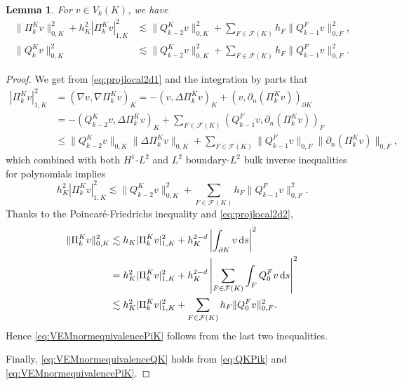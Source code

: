 \documentclass[10pt]{amsart}
\newtheorem{lemma}[theorem]{Lemma}
\numberwithin{equation}{section}
\begin{document}
\begin{lemma}
For $v\in V_k(K)$, we have
\begin{align}
\|\Pi_k^Kv\|_{0,K}^2+h_K^2|\Pi_k^Kv|_{1,K}^2&\lesssim \|Q_{k-2}^Kv\|_{0,K}^2+\sum_{F\in\mathcal F(K)}h_F\|Q_{k-1}^Fv\|_{0,F}^2, \label{eq:VEMnormequivalencePiK}\\
\|Q_k^Kv\|_{0,K}^2&\lesssim \|Q_{k-2}^Kv\|_{0,K}^2+\sum_{F\in\mathcal F(K)}h_F\|Q_{k-1}^Fv\|_{0,F}^2. \label{eq:VEMnormequivalenceQK}
\end{align}
\end{lemma}
\begin{proof}
We get from \eqref{eq:projlocal2d1} and the integration by parts that
\begin{align*}
|\Pi_k^Kv|_{1,K}^2&=(\nabla v, \nabla\Pi_k^Kv)_K=-(v, \Delta\Pi_k^Kv)_K+(v, \partial_n(\Pi_k^Kv))_{\partial K} \\
&=-(Q_{k-2}^Kv, \Delta\Pi_k^Kv)_K+\sum_{F\in\mathcal F(K)}(Q_{k-1}^Fv, \partial_n(\Pi_k^Kv))_{F} \\
&\leq\|Q_{k-2}^Kv\|_{0,K}\|\Delta\Pi_k^Kv\|_{0,K}+\sum_{F\in\mathcal F(K)}\|Q_{k-1}^Fv\|_{0,F}\|\partial_n(\Pi_k^Kv)\|_{0,F},
\end{align*}
which combined with both $H^1$-$L^2$ and $L^2$ boundary-$L^2$ bulk inverse inequalities for polynomials implies
\[%
h_K^2|\Pi_k^Kv|_{1,K}^2\lesssim \|Q_{k-2}^Kv\|_{0,K}^2+\sum_{F\in\mathcal F(K)}h_F\|Q_{k-1}^Fv\|_{0,F}^2. 
\]
Thanks to the Poincar\'e-Friedrichs inequality \cite{Necas1967} %
and \eqref{eq:projlocal2d2},
\begin{align*}  
\|\Pi_k^Kv\|_{0,K}^2&\lesssim h_K|\Pi_k^Kv|_{1,K}^2+h_K^{2-d}\left|\int_{\partial K}v\,{\rm d}s\right|^2 \\
&=h_K^2|\Pi_k^Kv|_{1,K}^2+h_K^{2-d}\left|\sum_{F\in\mathcal F(K)}\int_{F}Q_{0}^Fv\,{\rm d}s\right|^2 \\
&\lesssim h_K^2|\Pi_k^Kv|_{1,K}^2+\sum_{F\in\mathcal F(K)}h_F\|Q_{0}^Fv\|_{0,F}^2.
\end{align*}
Hence \eqref{eq:VEMnormequivalencePiK} follows from the last two inequalities.

Finally, \eqref{eq:VEMnormequivalenceQK} holds from \eqref{eq:QKPik} and \eqref{eq:VEMnormequivalencePiK}.
\end{proof}
\end{document}
